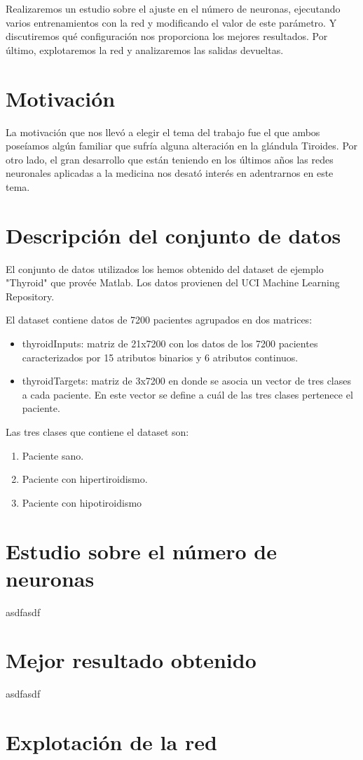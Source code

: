 \documentclass[a4paper,12pt,titlepage]{article}
\begin{document}
Realizaremos un estudio sobre el ajuste en el número de neuronas, ejecutando varios entrenamientos con la red y modificando el valor de este parámetro. Y discutiremos qué configuración nos proporciona los mejores resultados. Por último, explotaremos la red y analizaremos las salidas devueltas.

\section{Motivación}

La motivación que nos llevó a elegir el tema del trabajo fue el que ambos poseíamos algún familiar que sufría alguna alteración en la glándula Tiroides. Por otro lado,  el gran desarrollo que están teniendo en los últimos años las redes neuronales aplicadas a la medicina nos desató interés en adentrarnos en este tema.

\section{Descripción del conjunto de datos}

El conjunto de datos utilizados los hemos obtenido del dataset de ejemplo "Thyroid" que provée Matlab. Los datos provienen del UCI Machine Learning Repository. \citep{Asuncion+Newman:2007} 

El dataset contiene datos de 7200 pacientes agrupados en dos matrices:

\begin{itemize}[noitemsep]
	\item thyroidInputs: matriz de 21x7200 con los datos de los 7200 pacientes caracterizados por 15 atributos binarios y 6 atributos continuos.
	\item thyroidTargets: matriz de 3x7200 en donde se asocia un vector de tres clases a cada paciente. En este vector se define a cuál de las tres clases pertenece el paciente.
\end{itemize}

Las tres clases que contiene el dataset son:

\begin{enumerate}[noitemsep]
	\item Paciente sano.
	\item Paciente con hipertiroidismo.
	\item Paciente con hipotiroidismo
\end{enumerate}

\section{Estudio sobre el número de neuronas}

asdfasdf

\section{Mejor resultado obtenido}

asdfasdf

\section{Explotación de la red}


%
%
\end{document}
